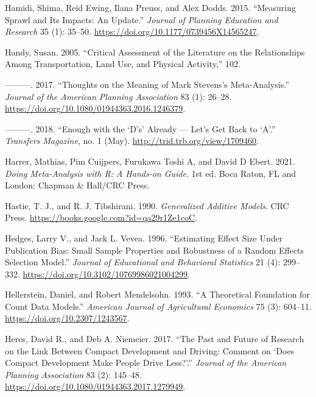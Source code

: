 \documentclass[
  11pt,
  openany]{memoir}
\newlength{\cslhangindent}
\newlength{\cslentryspacingunit} %
\newenvironment{CSLReferences}[2] %
 {%
  \setlength{\parindent}{0pt}
  \ifodd #1
  \let\oldpar\par
  \def\par{\hangindent=\cslhangindent\oldpar}
  \fi
  \setlength{\parskip}{#2\cslentryspacingunit}
 }%
 {}
\begin{document}
\begin{CSLReferences}{1}{0}
\leavevmode{}%
Hamidi, Shima, Reid Ewing, Ilana Preuss, and Alex Dodds. 2015. {``Measuring {Sprawl} and {Its Impacts}: An {Update}.''} \emph{Journal of Planning Education and Research} 35 (1): 35--50. \url{https://doi.org/10.1177/0739456X14565247}.

\leavevmode{}%
Handy, Susan. 2005. {``Critical {Assessment} of the {Literature} on the {Relationships Among Transportation}, {Land Use}, and {Physical Activity},''} 102.

\leavevmode{}%
---------. 2017. {``Thoughts on the {Meaning} of {Mark Stevens}'s {Meta}-{Analysis}.''} \emph{Journal of the American Planning Association} 83 (1): 26--28. \url{https://doi.org/10.1080/01944363.2016.1246379}.

\leavevmode{}%
---------. 2018. {``Enough with the {`{D}'s'} {Already} --- {Let}'s {Get Back} to {`{A}'}.''} \emph{Transfers Magazine}, no. 1 (May). \url{http://trid.trb.org/view/1709460}.

\leavevmode{}%
Harrer, Mathias, Pim Cuijpers, Furukawa Toshi A, and David D Ebert. 2021. \emph{Doing Meta-Analysis with {R}: A Hands-on Guide}. 1st ed. {Boca Raton, FL and London}: {Chapman \& Hall/CRC Press}.

\leavevmode{}%
Hastie, T. J., and R. J. Tibshirani. 1990. \emph{Generalized {Additive Models}}. {CRC Press}. \url{https://books.google.com?id=qa29r1Ze1coC}.

\leavevmode{}%
Hedges, Larry V., and Jack L. Vevea. 1996. {``Estimating {Effect Size Under Publication Bias}: Small {Sample Properties} and {Robustness} of a {Random Effects Selection Model}.''} \emph{Journal of Educational and Behavioral Statistics} 21 (4): 299--332. \url{https://doi.org/10.3102/10769986021004299}.

\leavevmode{}%
Hellerstein, Daniel, and Robert Mendelsohn. 1993. {``A {Theoretical Foundation} for {Count Data Models}.''} \emph{American Journal of Agricultural Economics} 75 (3): 604--11. \url{https://doi.org/10.2307/1243567}.

\leavevmode{}%
Heres, David R., and Deb A. Niemeier. 2017. {``The {Past} and {Future} of {Research} on the {Link Between Compact Development} and {Driving}: Comment on {`{Does Compact Development Make People Drive Less}?'}.''} \emph{Journal of the American Planning Association} 83 (2): 145--48. \url{https://doi.org/10.1080/01944363.2017.1279949}.


\end{CSLReferences}
\end{document}
